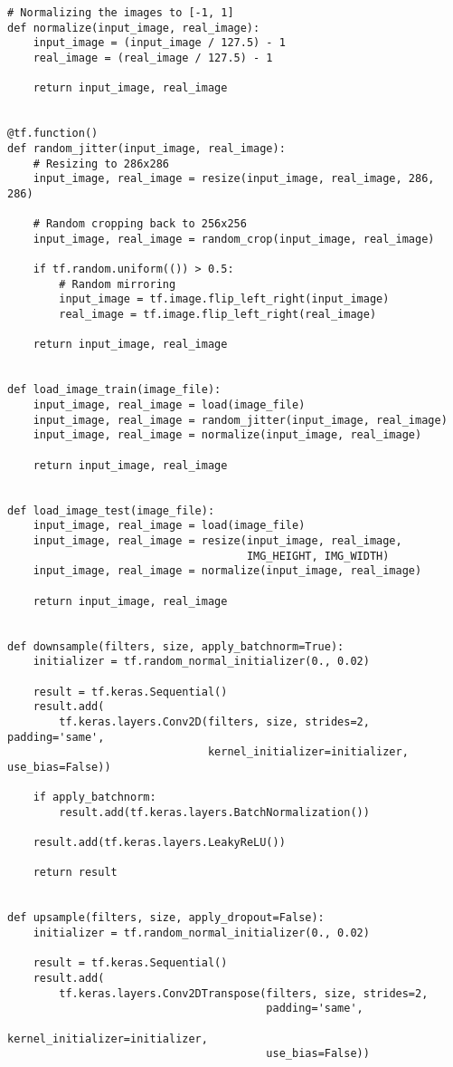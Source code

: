 \begin{lstlisting}
# Normalizing the images to [-1, 1]
def normalize(input_image, real_image):
    input_image = (input_image / 127.5) - 1
    real_image = (real_image / 127.5) - 1

    return input_image, real_image


@tf.function()
def random_jitter(input_image, real_image):
    # Resizing to 286x286
    input_image, real_image = resize(input_image, real_image, 286, 286)

    # Random cropping back to 256x256
    input_image, real_image = random_crop(input_image, real_image)

    if tf.random.uniform(()) > 0.5:
        # Random mirroring
        input_image = tf.image.flip_left_right(input_image)
        real_image = tf.image.flip_left_right(real_image)

    return input_image, real_image


def load_image_train(image_file):
    input_image, real_image = load(image_file)
    input_image, real_image = random_jitter(input_image, real_image)
    input_image, real_image = normalize(input_image, real_image)

    return input_image, real_image


def load_image_test(image_file):
    input_image, real_image = load(image_file)
    input_image, real_image = resize(input_image, real_image,
                                     IMG_HEIGHT, IMG_WIDTH)
    input_image, real_image = normalize(input_image, real_image)

    return input_image, real_image


def downsample(filters, size, apply_batchnorm=True):
    initializer = tf.random_normal_initializer(0., 0.02)

    result = tf.keras.Sequential()
    result.add(
        tf.keras.layers.Conv2D(filters, size, strides=2, padding='same',
                               kernel_initializer=initializer, use_bias=False))

    if apply_batchnorm:
        result.add(tf.keras.layers.BatchNormalization())

    result.add(tf.keras.layers.LeakyReLU())

    return result


def upsample(filters, size, apply_dropout=False):
    initializer = tf.random_normal_initializer(0., 0.02)

    result = tf.keras.Sequential()
    result.add(
        tf.keras.layers.Conv2DTranspose(filters, size, strides=2,
                                        padding='same',
                                        kernel_initializer=initializer,
                                        use_bias=False))


\end{lstlisting}
